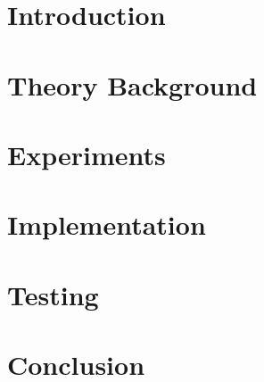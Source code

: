 \chapter{Introduction}
\label{chap:introduction}


\chapter{Theory Background}
\label{chap:theory}


\chapter{Experiments}
\label{chap:experiments}


\chapter{Implementation}
\label{chap:implementation}


\chapter{Testing}
\label{chap:testing}


\chapter{Conclusion}
\label{chap:conclusion}
